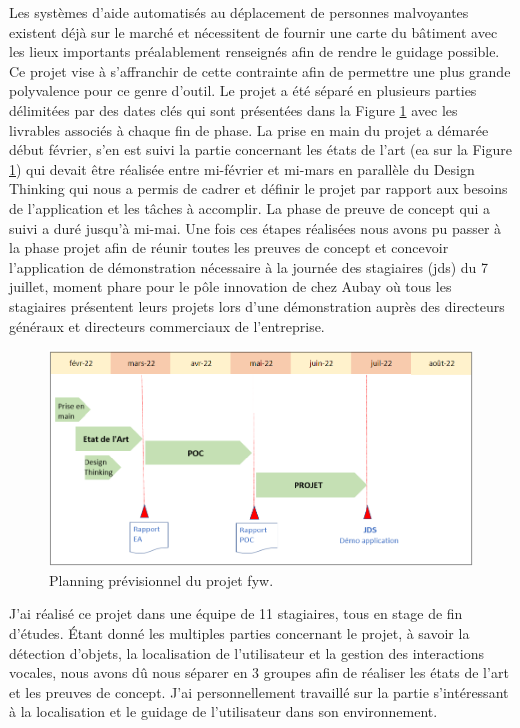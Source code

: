 \documentclass[11pt]{article}
\begin{document}
  Les systèmes d'aide automatisés au déplacement de personnes malvoyantes existent déjà sur le marché et nécessitent de fournir une 
  carte du bâtiment avec les lieux importants préalablement renseignés afin de rendre le guidage possible. Ce projet vise à s'affranchir 
  de cette contrainte afin de permettre une plus grande polyvalence pour ce genre d'outil.
  Le projet a été séparé en plusieurs parties délimitées par des dates clés qui sont présentées dans la Figure \ref{fig:Planning} 
  avec les livrables associés à chaque fin de phase.
  La prise en main du projet a démarée début février, s'en est suivi la partie concernant les états de l'art (\acrshort{ea} sur la Figure \ref{fig:Planning}) 
  qui devait être réalisée entre mi-février et mi-mars en parallèle du Design Thinking qui nous a permis de cadrer et définir le projet par 
  rapport aux besoins de l'application et les tâches à accomplir. La phase de preuve de concept qui a suivi a duré jusqu'à mi-mai. 
  Une fois ces étapes réalisées nous avons pu passer à la phase projet afin de réunir toutes les preuves de concept et concevoir l'application 
  de démonstration nécessaire à la journée des stagiaires (\acrshort{jds}) du 7 juillet, moment phare pour le pôle innovation de chez Aubay où tous 
  les stagiaires présentent leurs projets lors d'une démonstration auprès des directeurs généraux et directeurs commerciaux de l'entreprise.

  \begin{figure}[hbt]  
    \includegraphics[width=\textwidth]{Planning.png}    
    \caption{Planning prévisionnel du projet \acrshort{fyw}.}
    \label{fig:Planning}
  \end{figure}  
  
  J'ai réalisé ce projet dans une équipe de 11 stagiaires, tous en stage de fin d'études. Étant donné les multiples parties concernant le projet, 
  à savoir la détection d'objets, la localisation de l'utilisateur et la gestion des interactions vocales, nous avons dû nous séparer en 3 
  groupes afin de réaliser les états de l'art et les preuves de concept. J'ai personnellement travaillé sur la partie s'intéressant à la 
  localisation et le guidage de l'utilisateur dans son environnement. 
  \pagebreak
 
\end{document}
